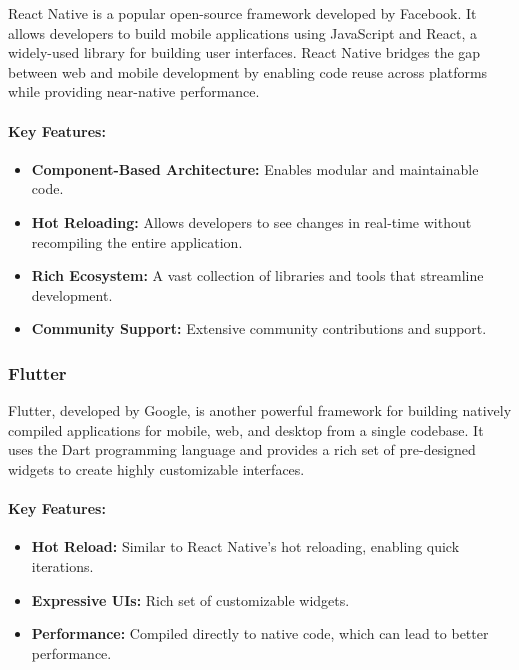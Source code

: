 React Native is a popular open-source framework developed by Facebook. It allows developers to build mobile applications using JavaScript and React, a widely-used library for building user interfaces. React Native bridges the gap between web and mobile development by enabling code reuse across platforms while providing near-native performance\cite{ReactNativeBook}.

\paragraph{Key Features:}

\begin{itemize}
    \item \textbf{Component-Based Architecture:} Enables modular and maintainable code.
    \item \textbf{Hot Reloading:} Allows developers to see changes in real-time without recompiling the entire application.
    \item \textbf{Rich Ecosystem:} A vast collection of libraries and tools that streamline development.
    \item \textbf{Community Support:} Extensive community contributions and support.
\end{itemize}

\subsubsection{Flutter}

Flutter, developed by Google, is another powerful framework for building natively compiled applications for mobile, web, and desktop from a single codebase. It uses the Dart programming language and provides a rich set of pre-designed widgets to create highly customizable interfaces\cite{Flutter}.

\paragraph{Key Features:}

\begin{itemize}
    \item \textbf{Hot Reload:} Similar to React Native's hot reloading, enabling quick iterations.
    \item \textbf{Expressive UIs:} Rich set of customizable widgets.
    \item \textbf{Performance:} Compiled directly to native code, which can lead to better performance.
\end{itemize}

